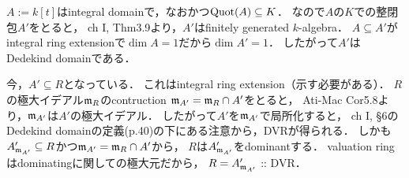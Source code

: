 \documentclass[a4paper]{jsarticle}
\begin{document}
    $A:=k[t]$はintegral domainで，なおかつ$\operatorname{Quot}(A) \subseteq K$．
    なので$A$の$K$での整閉包$A'$をとると，
    ch I, Thm3.9より，$A'$はfinitely generated $k$-algebra．
    $A \subseteq A'$がintegral ring extensionで$\dim A=1$だから$\dim A'=1$．
    したがって$A'$はDedekind domainである．

    今，$A' \subseteq R$となっている．
    これはintegral ring extension（示す必要がある）．
    $R$の極大イデアル$\mathfrak{m}_R$のcontruction $\mathfrak{m}_{A'}=\mathfrak{m}_R \cap A'$をとると，
    Ati-Mac Cor5.8より，$\mathfrak{m}_{A'}$は$A'$の極大イデアル．
    したがって$A'$を$\mathfrak{m}_{A'}$で局所化すると，
    ch I, \S 6のDedekind domainの定義(p.40)の下にある注意から，DVRが得られる．
    しかも$A'_{\mathfrak{m}_{A'}} \subseteq R$かつ$\mathfrak{m}_{A'}=\mathfrak{m}_R \cap A'$から，
    $R$は$A'_{\mathfrak{m}_{A'}}$をdominantする．
    valuation ringはdominatingに関しての極大元だから，
    $R=A'_{\mathfrak{m}_{A'}}$ :: DVR．
\end{document}
